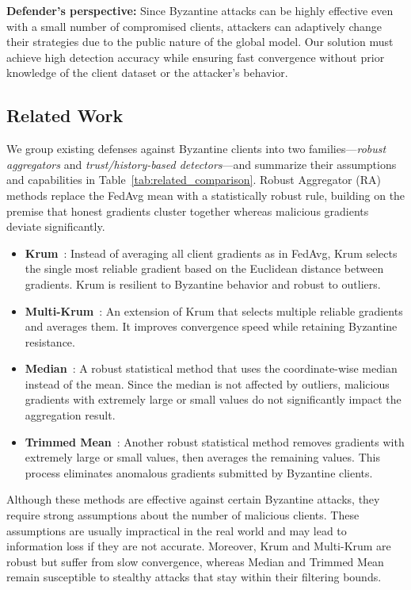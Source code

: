 \documentclass[journal]{IEEEtran}
\begin{document}
\noindent\textbf{Defender's perspective:} Since Byzantine attacks can be highly effective even with a small number of compromised clients, attackers can adaptively change their strategies due to the public nature of the global model. Our solution must achieve high detection accuracy while ensuring fast convergence without prior knowledge of the client dataset or the attacker's behavior.

\subsection{Related Work}

We group existing defenses against Byzantine clients into two families---\emph{robust aggregators} and \emph{trust/history-based detectors}---and summarize their assumptions and capabilities in Table~\ref{tab:related_comparison}. Robust Aggregator (RA) methods replace the FedAvg mean with a statistically robust rule, building on the premise that honest gradients cluster together whereas malicious gradients deviate significantly.

\begin{itemize}
    \item \textbf{Krum}~\cite{blanchard2017machine}: Instead of averaging all client gradients as in FedAvg, Krum selects the single most reliable gradient based on the Euclidean distance between gradients. Krum is resilient to Byzantine behavior and robust to outliers.

    \item \textbf{Multi-Krum}~\cite{blanchard2017machine}: An extension of Krum that selects multiple reliable gradients and averages them. It improves convergence speed while retaining Byzantine resistance.

    \item \textbf{Median}~\cite{yin2018byzantine}: A robust statistical method that uses the coordinate-wise median instead of the mean. Since the median is not affected by outliers, malicious gradients with extremely large or small values do not significantly impact the aggregation result.

    \item \textbf{Trimmed Mean}~\cite{yin2018byzantine}: Another robust statistical method removes gradients with extremely large or small values, then averages the remaining values. This process eliminates anomalous gradients submitted by Byzantine clients.
\end{itemize}

Although these methods are effective against certain Byzantine attacks, they require strong assumptions about the number of malicious clients. These assumptions are usually impractical in the real world and may lead to information loss if they are not accurate. Moreover, Krum and Multi-Krum are robust but suffer from slow convergence, whereas Median and Trimmed Mean remain susceptible to stealthy attacks that stay within their filtering bounds.
\end{document}
